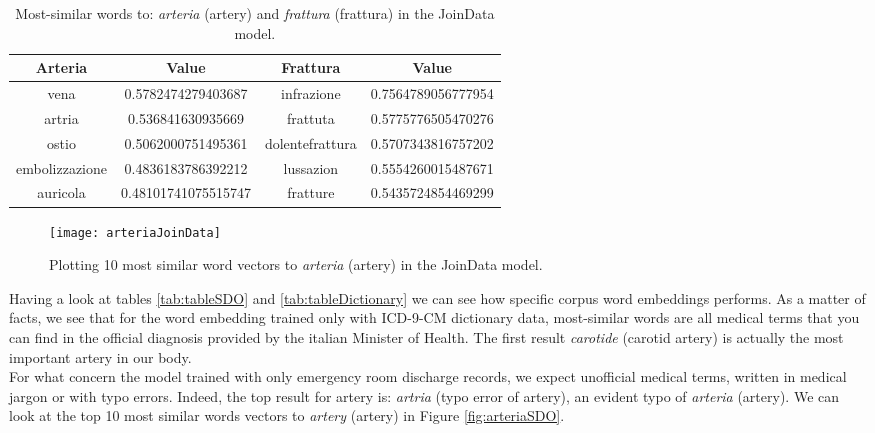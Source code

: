 \begin{table}[h!]
	\begin{center}
		\caption[Domain Specific - Most similar words in JoinData model]{Most-similar words to: \textit{arteria} (artery) and \textit{frattura} (frattura) in the JoinData model.}
		\label{tab:tableJoinData}
		\begin{tabular}{c|S|c|S}
			\toprule
			\textbf{Arteria} & \textbf{Value} & \textbf{Frattura} & \textbf{Value} \\
			\midrule
			vena & 0.5782474279403687 & infrazione & 0.7564789056777954 \\
			artria & 0.536841630935669 & frattuta & 0.5775776505470276 \\
			ostio & 0.5062000751495361 & dolentefrattura & 0.5707343816757202 \\
			embolizzazione & 0.4836183786392212 & lussazion & 0.5554260015487671 \\			
			auricola	& 0.48101741075515747 & fratture & 0.5435724854469299 \\
			\bottomrule
		\end{tabular}
	\end{center}
\end{table}

\begin{figure}[ht]
	\centering
	\texttt{[image: arteriaJoinData]}
	\caption[Artery - 10 most similar words plotted for JoinData model]{Plotting 10 most similar word vectors to \textit{arteria} (artery) in the JoinData model.}
	\label{fig:arteriaJoinData}
\end{figure}

Having a look at tables \ref{tab:tableSDO} and \ref{tab:tableDictionary} we can see how specific corpus word embeddings performs. As a matter of facts, we see that for the word embedding trained only with ICD-9-CM dictionary data, most-similar words are all medical terms that you can find in the official diagnosis provided by the italian Minister of Health. The first result \textit{carotide} (carotid artery) is actually the most important artery in our body.\\
For what concern the model trained with only emergency room discharge records, we expect unofficial medical terms, written in medical jargon or with typo errors. Indeed, the top result for artery is: \textit{artria} (typo error of artery), an evident typo of \textit{arteria} (artery). We can look at the top 10 most similar words vectors to \textit{artery} (artery) in Figure \ref{fig:arteriaSDO}.

